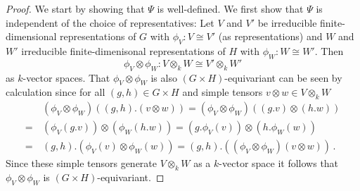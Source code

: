 \begin{proof}
  We start by showing that $\Psi$ is well-defined.
  We first show that $\Psi$ is independent of the choice of representatives:
  Let $V$ and $V'$ be irreducible finite-dimensional representations of $G$ with $\phi_V \colon V \cong V'$ (as representations) and $W$ and $W'$ irreducible finite-dimenisonal representations of $H$ with $\phi_W \colon W \cong W'$.
  Then
  \[
            \phi_V \otimes \phi_W
    \colon  V  \otimes_k W
    \cong   V' \otimes_k W'
  \]
  as $k$-vector spaces.
  That $\phi_V \otimes \phi_W$ is also $(G \times H)$-equivariant can be seen by calculation since for all $(g,h) \in G \times H$ and simple tensors $v \otimes w \in V \otimes_k W$
  \begin{align*}
     &\, (\phi_V \otimes \phi_W)((g,h).(v \otimes w))
    =    (\phi_V \otimes \phi_W)((g.v) \otimes (h.w)) \\
    =&\, (\phi_V(g.v)) \otimes (\phi_W(h.w))
    =    (g.\phi_V(v)) \otimes (h.\phi_W(w)) \\
    =&\, (g,h).(\phi_V(v) \otimes \phi_W(w))
    =    (g,h).((\phi_V \otimes \phi_W)(v \otimes w)) \,.
  \end{align*}
  Since these simple tensors generate $V \otimes_k W$ as a $k$-vector space it follows that $\phi_V \otimes \phi_W$ is $(G \times H)$-equivariant.
  

\end{proof}
